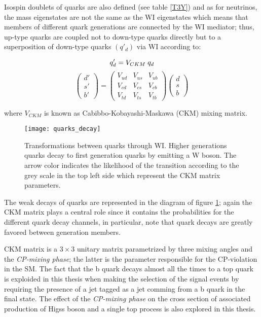 \noindent Isospin doublets of quarks are also defined (see table \ref{T3Y}) and as for neutrinos, the mass eigenstates are not the same as the WI eigenstates which means that members of different quark generations are connected by the WI mediator; thus, up-type quarks are coupled not to down-type quarks directly but to a superposition of down-type quarks $(q'_d)$ via WI according to: 

$$q'_d = V_{CKM}\hspace{0.1cm}q_d$$
\begin{equation}
\begin{pmatrix}d'\\ s'\\ b'\end{pmatrix}=\begin{pmatrix} V_{ud} & V_{us} & V_{ub}\\ V_{cd} & V_{cs} & V_{cb}\\ V_{td} & V_{ts} & V_{tb}\end{pmatrix}\begin{pmatrix}d\\s\\b\end{pmatrix}
\label{eq:qmixing}
\end{equation}

\noindent where $V_{CKM}$ is known as Cabibbo-Kobayashi-Maskawa (CKM) mixing matrix\cite{C,KM}. 

\begin{figure}[!h]
  \centering
  \texttt{[image: quarks\_decay]}
  \caption[WI transformations between quarks]{Transformations between quarks through WI. Higher generations quarks decay to first generation quarks by emitting a W boson. The arrow color indicates the likelihood of the transition according to the grey scale in the top left side which represent the CKM matrix parameters\cite{ckm}.}
  \label{quarks_decay}
\end{figure}

\noindent The weak decays of quarks are represented in the diagram of figure \ref{quarks_decay}; again the CKM matrix plays a central role since it contains the probabilities for the different quark decay channels, in particular, note that quark decays are greatly favored between generation members.

\noindent CKM matrix is a $3\times3$ unitary matrix parametrized by three mixing angles and the \textit{CP-mixing phase}; the latter is the parameter responsible for the CP-violation in the SM. The fact that the b quark decays almost all the times to a top quark is exploided in this thesis when making the selection of the signal events by requiring the presence of a jet tagged as a jet comming from a b quark in the final state. The effect of the \textit{CP-mixing phase} on the cross section of associated production of Higss boson and a single top process is also explored in this thesis.    

